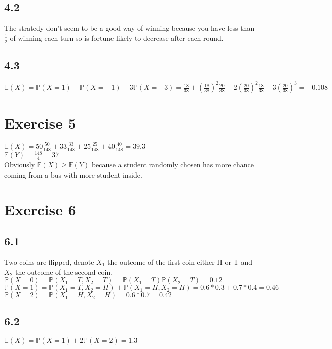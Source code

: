 \documentclass{article}
\begin{document}
    \subsection*{4.2}
    The stratedy don't seem to be a good way of winning because you have less than $\frac{1}{2}$ of winning each turn so is fortune likely to decrease after each round.
    \subsection*{4.3}
    $\mathbb{E}(X) = \mathbb{P}(X=1)-\mathbb{P}(X=-1)-3\mathbb{P}(X=-3) = \frac{18}{38}+(\frac{18}{38})^2\frac{20}{38} - 2(\frac{20}{38})^2\frac{18}{38} - 3(\frac{20}{38})^3 = -0.108$
    \section*{Exercise 5}
    $\mathbb{E}(X) = 50\frac{50}{148}+33\frac{33}{148}+25\frac{25}{148}+40\frac{40}{148} = 39.3$\\
    $\mathbb{E}(Y) = \frac{148 }{4}= 37$\\
    Obviously $\mathbb{E}(X)\ge \mathbb{E}(Y)$ because a student randomly chosen has more chance coming from a bus with more student inside.
    \section*{Exercise 6}
    \subsection*{6.1}
    Two coins are flipped, denote $X_1$ the outcome of the first coin either H or T and $X_2$ the outcome of the second coin.
    $\mathbb{P}(X=0) = \mathbb{P}(X_1 = T, X_2 = T) = \mathbb{P}(X_1=T)\mathbb{P}(X_2=T) = 0.12$\\
    $\mathbb{P}(X=1) = \mathbb{P}(X_1=T,X_2=H)+\mathbb{P}(X_1=H,X_2=H) = 0.6*0.3+0.7*0.4 = 0.46$\\
    $\mathbb{P}(X=2) = \mathbb{P}(X_1=H,X_2=H)=0.6*0.7 = 0.42$\\
    \subsection*{6.2}
    $\mathbb{E}(X) = \mathbb{P}(X=1)+2\mathbb{P}(X=2) = 1.3$\\
\end{document}
